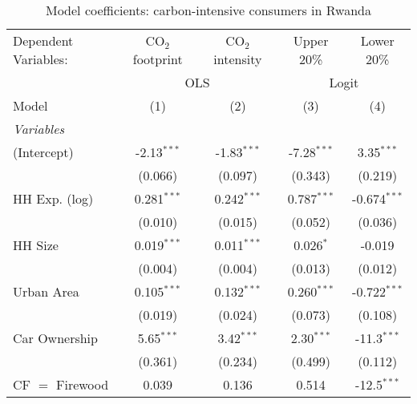 
\begin{table}[htbp!]
   \centering
   \small
   \begin{adjustbox}{width = 1\textwidth, max height = 0.95\textheight, center}
      \begin{threeparttable}[b]
         \caption{\label{tab:Logit_1_RWA} Model coefficients: carbon-intensive consumers in Rwanda}
         \begin{tabular}{lcccc}
            \tabularnewline \midrule \midrule
            Dependent Variables: & CO$_{2}$ footprint & CO$_{2}$ intensity & Upper 20\%    & Lower 20\%\\   
             & \multicolumn{2}{c}{OLS} & \multicolumn{2}{c}{Logit} \\ 
            Model                & (1)                & (2)                & (3)           & (4)\\  
            \midrule
            \emph{Variables}\\
            (Intercept)          & -2.13$^{***}$      & -1.83$^{***}$      & -7.28$^{***}$ & 3.35$^{***}$\\   
                                 & (0.066)            & (0.097)            & (0.343)       & (0.219)\\   
            HH Exp. (log)        & 0.281$^{***}$      & 0.242$^{***}$      & 0.787$^{***}$ & -0.674$^{***}$\\   
                                 & (0.010)            & (0.015)            & (0.052)       & (0.036)\\   
            HH Size              & 0.019$^{***}$      & 0.011$^{***}$      & 0.026$^{*}$   & -0.019\\   
                                 & (0.004)            & (0.004)            & (0.013)       & (0.012)\\   
            Urban Area           & 0.105$^{***}$      & 0.132$^{***}$      & 0.260$^{***}$ & -0.722$^{***}$\\   
                                 & (0.019)            & (0.024)            & (0.073)       & (0.108)\\   
            Car Ownership        & 5.65$^{***}$       & 3.42$^{***}$       & 2.30$^{***}$  & -11.3$^{***}$\\   
                                 & (0.361)            & (0.234)            & (0.499)       & (0.112)\\   
            CF $=$ Firewood      & 0.039              & 0.136              & 0.514         & -12.5$^{***}$\\   

\end{tabular}
\end{threeparttable}
\end{adjustbox}
\end{table}
